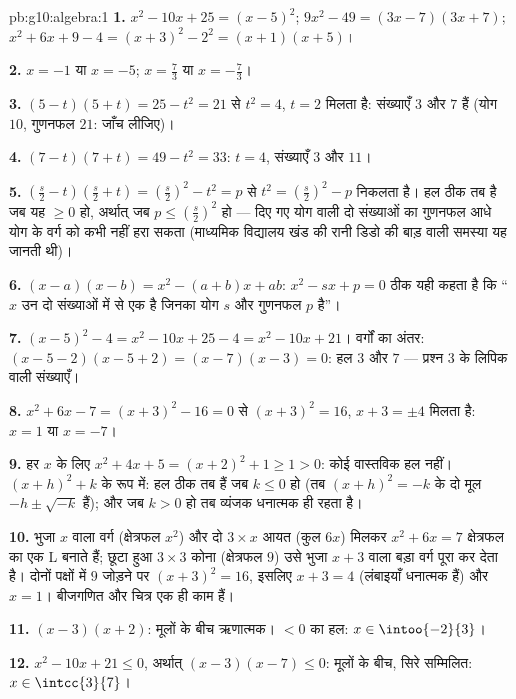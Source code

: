 \begin{solution}{pb:g10:algebra:1}
\textbf{1.} $x^2 - 10x + 25 = (x - 5)^2$;
$9x^2 - 49 = (3x - 7)(3x + 7)$;
$x^2 + 6x + 9 - 4 = (x + 3)^2 - 2^2 = (x + 1)(x + 5)$।

\textbf{2.} $x = -1$ या $x = -5$; \quad $x = \frac73$ या $x = -\frac73$।

\textbf{3.} $(5 - t)(5 + t) = 25 - t^2 = 21$ से $t^2 = 4$, $t = 2$ मिलता है: संख्याएँ $3$ और $7$ हैं
(योग $10$, गुणनफल $21$: जाँच लीजिए)।

\textbf{4.} $(7 - t)(7 + t) = 49 - t^2 = 33$: $t = 4$, संख्याएँ $3$ और $11$।

\textbf{5.} $\left(\frac s2 - t\right)\left(\frac s2 + t\right)
= \left(\frac s2\right)^2 - t^2 = p$ से $t^2 = \left(\frac s2\right)^2 - p$ निकलता है। हल ठीक तब है जब यह $\geq 0$ हो, अर्थात्
जब $p \leq \left(\frac s2\right)^2$ हो --- दिए गए योग वाली दो संख्याओं का गुणनफल आधे योग के वर्ग को
कभी नहीं हरा सकता (माध्यमिक विद्यालय खंड की रानी डिडो की बाड़ वाली समस्या
यह जानती थी)।

\textbf{6.} $(x - a)(x - b) = x^2 - (a + b)x + ab$:  $x^2 - sx + p = 0$ ठीक यही कहता है कि ``$x$ उन दो संख्याओं
में से एक है जिनका योग $s$ और गुणनफल $p$ है''।

\textbf{7.} $(x-5)^2 - 4 = x^2 - 10x + 25 - 4 = x^2 - 10x +
21$। वर्गों का अंतर: $(x - 5 - 2)(x - 5 + 2) = (x - 7)(x - 3) = 0$: हल $3$ और $7$ --- प्रश्न 3
के लिपिक वाली संख्याएँ।

\textbf{8.} $x^2 + 6x - 7 = (x + 3)^2 - 16 = 0$ से $(x + 3)^2 = 16$, $x + 3 = \pm 4$ मिलता है: $x = 1$ या $x = -7$।

\textbf{9.} हर $x$ के लिए $x^2 + 4x + 5 = (x + 2)^2 + 1 \geq 1 > 0$: कोई वास्तविक हल नहीं। $(x + h)^2 + k$ के रूप में:
हल ठीक तब हैं जब $k \leq 0$ हो (तब $(x+h)^2 = -k$ के दो मूल $-h \pm \sqrt{-k}$ हैं); और जब $k > 0$ हो
तब व्यंजक धनात्मक ही रहता है।

\textbf{10.} भुजा $x$ वाला वर्ग (क्षेत्रफल $x^2$) और दो $3 \times x$ आयत (कुल
$6x$) मिलकर $x^2 + 6x = 7$ क्षेत्रफल का एक L बनाते हैं; छूटा हुआ $3 \times 3$ कोना
(क्षेत्रफल $9$) उसे भुजा $x + 3$ वाला बड़ा वर्ग पूरा कर देता है। दोनों
पक्षों में $9$ जोड़ने पर $(x + 3)^2 = 16$, इसलिए $x + 3 = 4$ (लंबाइयाँ धनात्मक हैं) और
$x = 1$। बीजगणित और चित्र एक ही काम हैं।

\textbf{11.} $(x-3)(x+2)$: मूलों के बीच ऋणात्मक। $< 0$ का हल: $x \in \intoo{-2}{3}$।

\textbf{12.} $x^2 - 10x + 21 \leq 0$, अर्थात् $(x - 3)(x - 7) \leq 0$: मूलों के बीच, सिरे सम्मिलित: $x \in \intcc{3}{7}$।


\end{solution}
